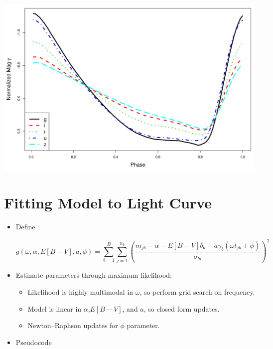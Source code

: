 \documentclass[a0,portrait]{a0poster}
\begin{document}
\begin{multicols}{2}
\begin{itemize}
\begin{center}\vspace{1cm}
\includegraphics[width=0.5\linewidth]{templates.pdf}
\end{center}\vspace{1cm}


\end{itemize}


\section*{Fitting Model to Light Curve}

\begin{itemize}

\item Define

\begin{equation*}
g(\omega,\alpha,E[B-V],a,\phi) = \sum_{b=1}^B \sum_{j=1}^{n_b}\left(\frac{m_{jb} - \alpha - E[B-V]\delta_b - a\gamma_b(\omega t_{jb} + \phi)}{\sigma_{bi}}\right)^2
\end{equation*}

\item Estimate parameters through maximum likelihood:
\begin{itemize}
\item Likelihood is highly multimodal in $\omega$, so perform grid search on frequency.
\item Model is linear in $\alpha$,$E[B-V]$, and $a$, so closed form updates.
\item Newton--Raphson updates for $\phi$ parameter.
\end{itemize}

\item Pseudocode


\end{itemize}
\end{multicols}
\end{document}
